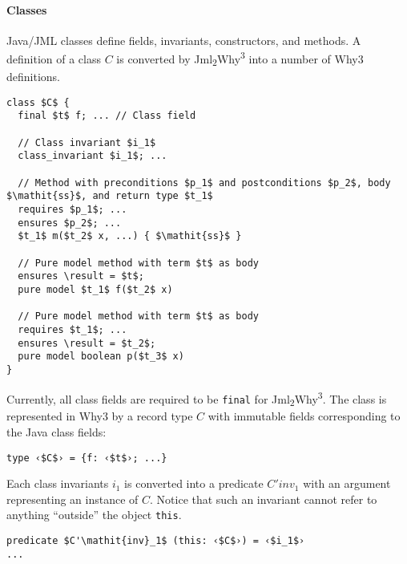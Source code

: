 \documentclass[a4paper]{report}
\newcommand{\jmlwhy}{\texorpdfstring{Jml\textsubscript{2}Why\textsuperscript{3}}{Jml2Why3}}
\begin{document}
\paragraph{Classes}
\label{sec:conversion-classes}

Java/JML classes define fields, invariants, constructors, and methods. A
definition of a class $C$ is converted by \jmlwhy{} into a number of Why3
definitions.

\begin{lstlisting}
class $C$ {
  final $t$ f; ... // Class field

  // Class invariant $i_1$
  class_invariant $i_1$; ...

  // Method with preconditions $p_1$ and postconditions $p_2$, body $\mathit{ss}$, and return type $t_1$
  requires $p_1$; ...
  ensures $p_2$; ...
  $t_1$ m($t_2$ x, ...) { $\mathit{ss}$ }

  // Pure model method with term $t$ as body
  ensures \result = $t$;
  pure model $t_1$ f($t_2$ x)

  // Pure model method with term $t$ as body
  requires $t_1$; ...
  ensures \result = $t_2$;
  pure model boolean p($t_3$ x)
}
\end{lstlisting}

Currently, all class fields are required to be \lstinline{final} for \jmlwhy.
The class is represented in Why3 by a record type $C$ with immutable fields
corresponding to the Java class fields:

\begin{lstlisting}
type ‹$C$› = {f: ‹$t$›; ...}
\end{lstlisting}

Each class invariants $i_1$ is converted into a predicate $C'\mathit{inv}_1$
with an argument representing an instance of $C$. Notice that such an invariant
cannot refer to anything ``outside'' the object \lstinline{this}.

\begin{lstlisting}
predicate $C'\mathit{inv}_1$ (this: ‹$C$›) = ‹$i_1$›
...
\end{lstlisting}
\end{document}
